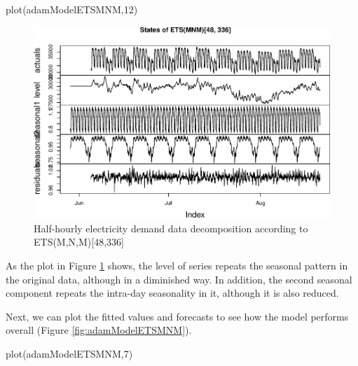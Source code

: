 \documentclass[
]{book}
\newenvironment{Shaded}{\begin{snugshade}}{\end{snugshade}}
\newcommand{\DecValTok}[1]{\textcolor[rgb]{0.00,0.00,0.81}{#1}}
\newcommand{\FunctionTok}[1]{\textcolor[rgb]{0.00,0.00,0.00}{#1}}
\newcommand{\NormalTok}[1]{#1}
\theoremstyle{definition}
\theoremstyle{definition}
\theoremstyle{definition}
\theoremstyle{definition}
\theoremstyle{remark}
\begin{document}
\begin{Shaded}
\begin{Highlighting}[]
\FunctionTok{plot}\NormalTok{(adamModelETSMNM,}\DecValTok{12}\NormalTok{)}
\end{Highlighting}
\end{Shaded}

\begin{figure}
\centering
\includegraphics{Svetunkov--2022----ADAM_files/figure-latex/adamModelETSMNM12-1.pdf}
\caption{\label{fig:adamModelETSMNM12}Half-hourly electricity demand data decomposition according to ETS(M,N,M){[}48,336{]}}
\end{figure}

As the plot in Figure \ref{fig:adamModelETSMNM12} shows, the level of series repeats the seasonal pattern in the original data, although in a diminished way. In addition, the second seasonal component repeats the intra-day seasonality in it, although it is also reduced.

Next, we can plot the fitted values and forecasts to see how the model performs overall (Figure \ref{fig:adamModelETSMNM}).

\begin{Shaded}
\begin{Highlighting}[]
\FunctionTok{plot}\NormalTok{(adamModelETSMNM,}\DecValTok{7}\NormalTok{)}
\end{Highlighting}
\end{Shaded}
\end{document}
